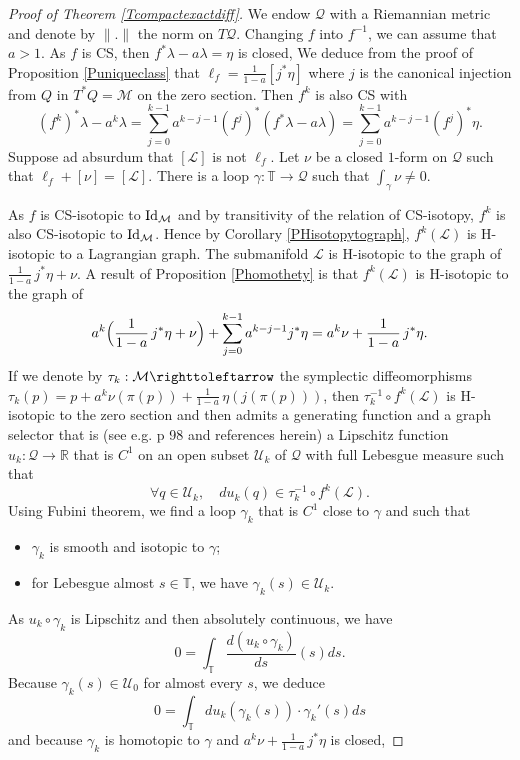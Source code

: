 \documentclass[10pt]{amsart}
\theoremstyle{definition}
\def\R{\mathbb{R}}
\def\T{\mathbb{T}}
\def\cL{{\mathcal L}}
\def\cM{{\mathcal M}}
\def\cQ{{\mathcal Q}}
\def\cU{{\mathcal U}}
\providecommand{\eg}{e.g.}\providecommand{\ie}{i.e.}\providecommand{\etc}{etc.}\providecommand{\resp}{resp.}\providecommand{\cf}{cf.}
\begin{document}
\begin{proof}[Proof of Theorem \ref{Tcompactexactdiff}]
We endow $\cQ$ with a Riemannian metric and denote by $\|.\|$ the norm on $T\cQ$. Changing $f$ into $f^{-1}$, we can assume that $a>1$. As $f$ is CS, then $f^*\lambda-a\lambda=\eta$ is closed, We deduce from the proof of Proposition \ref{Puniqueclass} that $\ell_f=\frac{1}{1-a}[j^*\eta]$ where $j$ is the canonical injection from $Q$ in $T^*Q=\cM$ on the zero section.
Then $f^k$ is also CS with
\[
(f^k)^*\lambda-a^k\lambda=\sum_{j=0}^{k-1}a^{k-j-1}(f^j)^*(f^*\lambda-a\lambda)=\sum_{j=0}^{k-1}a^{k-j-1}(f^j)^*\eta.
\]
Suppose ad absurdum that $[\cL]$ is not $\ell_f$. Let $\nu$ be a closed $1$-form on $\cQ$ such that $\ell_f+[\nu]=[\cL]$. There is a loop $\gamma:\T\to\cQ$ such that $\int_\gamma \nu\not=0$.

As $f$ is CS-isotopic to ${\rm Id}_\cM$ and by transitivity of the relation of CS-isotopy, $f^k$ is also CS-isotopic to ${\rm Id}_\cM$. Hence by Corollary \ref{PHisotopytograph}, $f^k(\cL)$ is H-isotopic to a Lagrangian graph. The submanifold $\cL$ is H-isotopic to the graph of
$\frac{1}{1-a}\,j^*\eta+\nu$. A result of Proposition \ref{Phomothety} is that $f^k(\cL)$ is H-isotopic to the graph of
\[
a^k\Bigl( \frac{1}{1-a}\,j^*\eta+\nu\Bigr)+\sum_{j=0}^{k-1}a^{k-j-1}j^*\eta=a^k\nu+\frac{1}{1-a}\,j^*\eta.
\]
If we denote by $\tau_k:\cM\righttoleftarrow$ the symplectic diffeomorphisms $\tau_k(p)=p+ a^k\nu(\pi(p))+\frac{1}{1-a}\,\eta(j(\pi(p)))$, then $\tau_{k}^{-1}\circ f^k(\cL)$ is H-isotopic to the zero section and then admits a generating function and a graph selector that is (see \eg \cite{Sib2004} p 98 and references herein) a Lipschitz function $u_k:\cQ\to \R$ that is $C^1$ on an open subset $\cU_k$ of $\cQ$ with full Lebesgue measure such that
\[
\forall q\in\cU_k,\quad du_k(q)\in \tau_{k}^{-1}\circ f^k(\cL).
\]
Using Fubini theorem, we find a loop $\gamma_k$ that is $C^1$ close to $\gamma$ and such that
\begin{itemize}
\item $\gamma_k$ is smooth and isotopic to $\gamma$;
\item for Lebesgue almost $s\in\T$, we have $\gamma_k(s)\in\cU_k$.
\end{itemize}
As $u_k\circ \gamma_k $ is Lipschitz and then absolutely continuous, we have
\[
0=\int_\T \frac{d(u_k\circ \gamma_k)}{ds}(s)ds.
\]
Because $\gamma_k(s)\in\cU_0$ for almost every $s$, we deduce
\[
0=\int_\T du_k(\gamma_k(s))\cdot \gamma_k'(s)ds
\]
and because $\gamma_k$ is homotopic to $\gamma$ and $a^k\nu+\frac{1}{1-a}\,j^*\eta$ is closed,

\end{proof}
\end{document}

